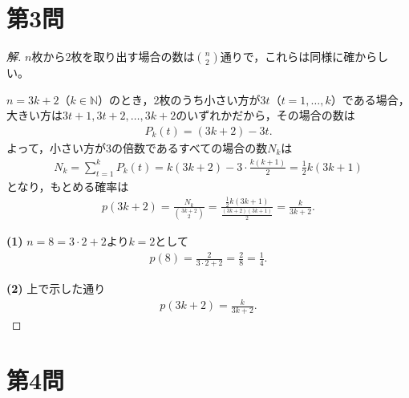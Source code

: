 \documentclass[../main.tex]{subfiles}
\begin{document}
\newpage

\section*{第3問}

\begin{proof}[解]
  $n$枚から2枚を取り出す場合の数は$\binom n2$通りで，これらは同様に確からしい。

  $n=3k+2$（$k\in\mathbb N$）のとき，2枚のうち小さい方が$3t$（$t=1,\dots,k$）である場合，大きい方は$3t+1,3t+2,\dots,3k+2$のいずれかだから，その場合の数は
  \begin{align*}
    P_k(t)=(3k+2)-3t.
  \end{align*}
  よって，小さい方が3の倍数であるすべての場合の数$N_k$は
  \begin{align*}
    N_k=\sum_{t=1}^kP_k(t)=k(3k+2)-3\cdot\frac{k(k+1)}2=\frac12k(3k+1)
  \end{align*}
  となり，もとめる確率は
  \begin{align*}
    p(3k+2)=\frac{N_k}{\binom{3k+2}2}=\frac{\frac12k(3k+1)}{\frac{(3k+2)(3k+1)}2}=\frac k{3k+2}.
  \end{align*}

  \textbf{(1)} $n=8=3\cdot2+2$より$k=2$として
  \begin{align*}
    p(8)=\frac2{3\cdot2+2}=\frac28=\frac14.
  \end{align*}

  \textbf{(2)} 上で示した通り
  \begin{align*}
    p(3k+2)=\frac k{3k+2}.
  \end{align*}
\end{proof}

\newpage

\section*{第4問}
\end{document}
